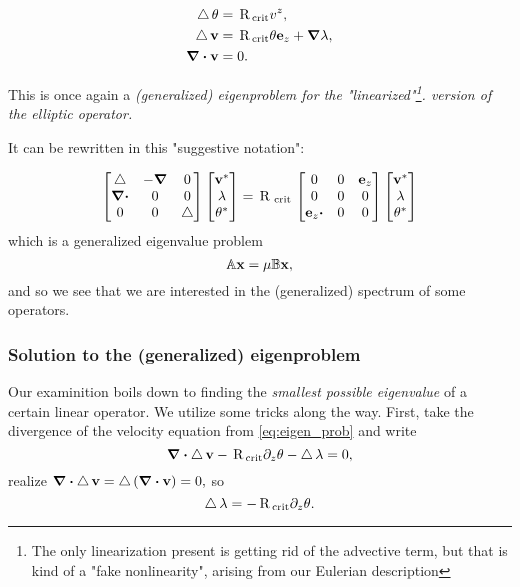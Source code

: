 \documentclass[../main.tex]{subfiles}
\begin{document}
\begin{align}
	\label{eq:eigen_prob}
	\laplace \theta &= \, \text{R} \,_{\text{crit}} v^z,\\
	\laplace \vb{v} &= \, \text{R} \,_{\text{crit}}\theta \vb{e}_z + \grad \lambda,\\
	\divergence{\vb{v}} &= 0.
\end{align}

This is once again a \textit{(generalized) eigenproblem for the "linearized"\footnote{The only linearization present is getting rid of the advective term, but that is kind of a "fake nonlinearity", arising from our Eulerian description}. version of the elliptic operator.}

It can be rewritten in this "suggestive notation":

\[
	\begin{bmatrix}
		\laplace & - \grad & 0 \\
		\grad \vdot & 0 & 0 \\
		0 & 0 & \laplace
	\end{bmatrix}
	\begin{bmatrix}
		\vb{v}^{*}\\
		\lambda \\
		\theta^{*}
	\end{bmatrix}
	= \, \text{R} \,_{\, \text{crit} \,}\begin{bmatrix}
		0 & 0 & \vb{e}_z \\
		0 & 0 & 0 \\
		\vb{e}_z \vdot & 0 & 0
	\end{bmatrix}
	\begin{bmatrix}
		\vb{v}^{*} \\
		\lambda \\
		\theta^{*}
	\end{bmatrix}
\]
which is a generalized eigenvalue problem
\[
	\mathbb{A} \vb{x} = \mu \mathbb{B} \vb{x},
\]
and so we see that we are interested in the (generalized) spectrum of some operators. 

\subsubsection{Solution to the (generalized) eigenproblem}
\label{sec:eigenprob}
Our examinition boils down to finding the \textit{smallest possible eigenvalue} of a certain linear operator. We utilize some tricks along the way. First, take the divergence of the velocity equation from \ref{eq:eigen_prob} and write
\[
	\divergence{\laplace \vb{v}} - \, \text{R} \,_{\text{crit}} \partial_{z}\theta - \laplace \lambda = 0,
\]
realize $\divergence{\laplace \vb{v}} = \laplace \qty(\divergence{\vb{v}}) = 0,$ so
\[
	\operatorname{\bigtriangleup} \lambda = - \, \text{R} \,_{\text{crit}} \partial_{z} \theta.
\]
\end{document}
